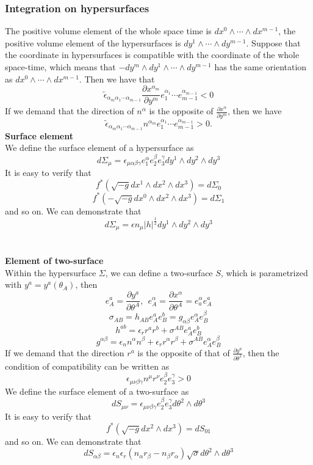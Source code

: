 \documentclass{article}
\begin{document}
\subsubsection{Integration on hypersurfaces}
The positive volume element of the whole space time is $dx^{0} \wedge \cdots \wedge dx^{m-1}$, the positive volume element of the hypersurfaces is $dy^{1} \wedge \cdots \wedge dy^{m-1}$.
Suppose that the coordinate in hypersurfaces is compatible with the  coordinate of the whole space-time, which means that $-dy^{m} \wedge dy^1 \wedge \cdots \wedge dy^{m-1} $ has the same orientation as $dx^0 \wedge \cdots \wedge dx^{m-1}$. Then we have that
\[\tilde{\epsilon}_{\alpha_{m} \alpha_{1} \cdots \alpha_{m-1}} \frac{\partial x^{\alpha_m}}{\partial y^m} e_1^{\alpha_1} \cdots e_{m-1}^{\alpha_{m-1}} < 0\]
If we demand that the direction of $n^{\alpha}$ is the opposite of $\frac{\partial x^{\alpha}}{\partial y^m}$, then we have
\[\tilde{\epsilon}_{\alpha_{m} \alpha_{1} \cdots \alpha_{m-1}} n^{\alpha_m} e_1^{\alpha_1} \cdots e_{m-1}^{\alpha_{m-1}} > 0.\]
\textbf{Surface element}\\
We define the surface element of a hypersurface as
\[d\Sigma_{\mu} = \epsilon_{\mu \alpha \beta \gamma} e_{1}^{\alpha} e_{2}^{\beta} e_{3}^{\gamma} dy^1 \wedge dy^2 \wedge dy^3\]
It is easy to verify that
\[f^*(\sqrt{-g} dx^1 \wedge dx^2 \wedge dx^3) = d\Sigma_0\]
\[f^*(-\sqrt{-g} dx^0 \wedge dx^2 \wedge dx^3) = d\Sigma_1\]
and so on.
We can demonstrate that
\[d\Sigma_{\mu} = \epsilon n_{\mu} |h|^{\frac{1}{2}} dy^1 \wedge dy^2 \wedge dy^3\]\\ \\
\textbf{Element of two-surface}\\
Within the hypersurface $\Sigma$, we can define a two-surface $S$, which is parametrized with $y^a = y^a(\theta_A)$, then
\[e_A^a = \frac{\partial y^a}{\partial \theta^A}, \ \ e_A^{\alpha} = \frac{\partial x^{\alpha}}{\partial \theta^{A}} = e_a^{\alpha} e_A^a \]
\[\sigma_{AB} = h_{AB}e_A^a e_B^b = g_{\alpha \beta} e_A^{\alpha} e_B^{\beta}\]
\[h^{ab} = \epsilon_r r^a r^b + \sigma^{AB} e_A^a e_B^b\]
\[g^{\alpha \beta} = \epsilon_n n^{\alpha} n^{\beta} + \epsilon_r r^{\alpha} r^{\beta} + \sigma^{AB} e_A^{\alpha} e_B^{\beta}\]
If we demand that the direction $r^a$ is the opposite of that of $\frac{\partial y^a}{\partial \theta^{1}}$, then the condition of compatibility can be written as
\[\epsilon_{\mu \nu \beta \gamma}n^{\mu} r^{\nu} e_2^{\beta} e_3^{\gamma} > 0\]
We define the surface element of a two-surface as
\[dS_{\mu \nu} = \epsilon_{\mu \nu \beta \gamma} e_2^{\beta} e_3^{\gamma} d\theta^2 \wedge d\theta^3\]
It is easy to verify that
\[f^*(\sqrt{-g} dx^2 \wedge dx^3) = dS_{01}\]
and so on. We can demonstrate that
\[dS_{\alpha \beta} = \epsilon_n \epsilon_r (n_{\alpha}r_{\beta} - n_{\beta}r_{\alpha}) \sqrt{\sigma} d\theta^2 \wedge d\theta^3\]
\end{document}
